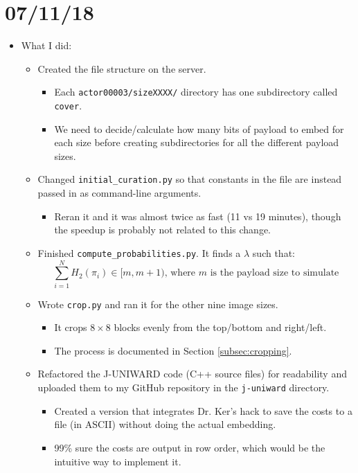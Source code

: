 \documentclass[11pt,a4paper]{report}
\begin{document}
\section{07/11/18}

\begin{itemize}

\item What I did:
  \begin{itemize}
  \item Created the file structure on the server.
    \begin{itemize}
    \item Each \texttt{actor00003/sizeXXXX/} directory has one subdirectory called \texttt{cover}.
    \item We need to decide/calculate how many bits of payload to embed for each size before creating subdirectories for all the different payload sizes.
    \end{itemize}

  \item Changed \texttt{initial\_curation.py} so that constants in the file are instead passed in as command-line arguments.
    \begin{itemize}
    \item Reran it and it was almost twice as fast (11 vs 19 minutes), though the speedup is probably not related to this change.
    \end{itemize}

  \item Finished \texttt{compute\_probabilities.py}. It finds a $\lambda$ such that:
    \begin{equation*}
    \sum\limits_{i=1}^N H_2(\pi_i) \in [m, m+1)\text{, where $m$ is the payload size to simulate}
    \end{equation*}

  \item Wrote \texttt{crop.py} and ran it for the other nine image sizes.
    \begin{itemize}
    \item It crops $8\times8$ blocks evenly from the top/bottom and right/left.
    \item The process is documented in Section \ref{subsec:cropping}.
    \end{itemize}

  \item Refactored the J-UNIWARD code (C++ source files) for readability and uploaded them to my GitHub repository in the \texttt{j-uniward} directory.
    \begin{itemize}
    \item Created a version that integrates Dr. Ker's hack to save the costs to a file (in ASCII) without doing the actual embedding.
    \item 99\% sure the costs are output in row order, which would be the intuitive way to implement it.
  \end{itemize}


\end{itemize}
\end{itemize}
\end{document}
